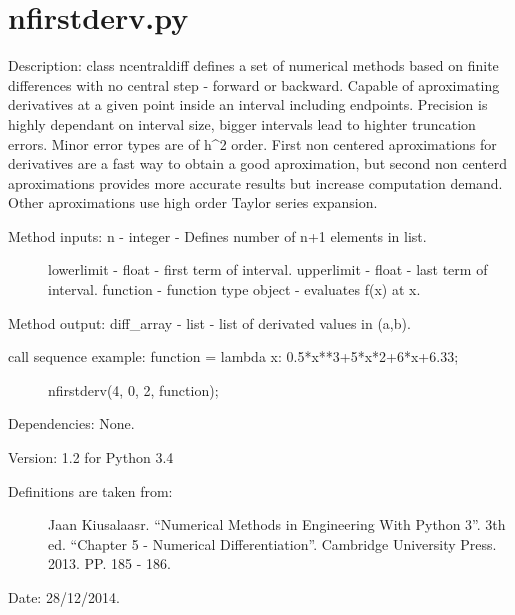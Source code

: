 \documentclass[letterpaper,10pt,oneside]{sphinxmanual}
\theoremstyle{plain}%
\theoremstyle{definition}%
\theoremstyle{remark}%
\begin{document}
\section{nfirstderv.py}
\label{code:module-nfirstderv}\label{code:nfirstderv-py}
Description: class ncentraldiff defines a set of numerical methods based on
finite differences with no central step - forward or backward. Capable of
aproximating derivatives at a given point inside an interval including 
endpoints. Precision is highly dependant on interval size, bigger intervals
lead to highter truncation errors. Minor error types are of h\textasciicircum{}2 order. First
non centered aproximations for derivatives are a fast way to obtain a good
aproximation, but second non centerd aproximations provides more accurate
results but increase computation demand. Other aproximations use high order
Taylor series expansion.
\begin{description}
\item[{Method inputs: n - integer - Defines number of n+1 elements in list.}] \leavevmode
lowerlimit - float - first term of interval.
upperlimit - float - last term of interval.
function - function type object - evaluates f(x) at x.

\end{description}

Method output: diff\_array - list - list of derivated values in (a,b).
\begin{description}
\item[{call sequence example: function = lambda x: 0.5*x**3+5*x*2+6*x+6.33;}] \leavevmode
nfirstderv(4, 0, 2, function);

\end{description}

Dependencies: None.

Version: 1.2 for Python 3.4
\begin{description}
\item[{Definitions are taken from:}] \leavevmode
Jaan Kiusalaasr. ``Numerical Methods in Engineering With Python 3''.
3th ed. ``Chapter 5 - Numerical Differentiation''. 
Cambridge University Press. 2013. PP. 185 - 186.

\end{description}




Date: 28/12/2014.
\end{document}
